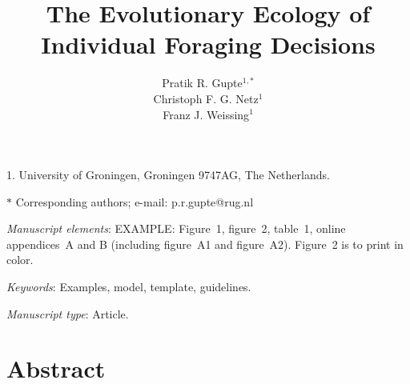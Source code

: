 \documentclass[11pt]{article}
\title{The Evolutionary Ecology of Individual Foraging Decisions}
\author{Pratik R. Gupte$^{1,\ast}$ \\ 
        Christoph F. G. Netz$^{1}$ \\ 
        Franz J. Weissing$^{1}$}
\date{}
\begin{document}
\maketitle

\noindent{} 1. University of Groningen, Groningen 9747AG, The Netherlands.

\noindent{} $\ast$ Corresponding authors; e-mail: p.r.gupte@rug.nl

\bigskip

\textit{Manuscript elements}: EXAMPLE: Figure~1, figure~2, table~1, online appendices~A and B (including figure~A1 and figure~A2). Figure~2 is to print in color.

\bigskip

\textit{Keywords}: Examples, model, template, guidelines.

\bigskip

\textit{Manuscript type}: Article. %

\bigskip


\linenumbers{}
\modulolinenumbers[1]

\newpage{}

\section*{Abstract}
\end{document}
